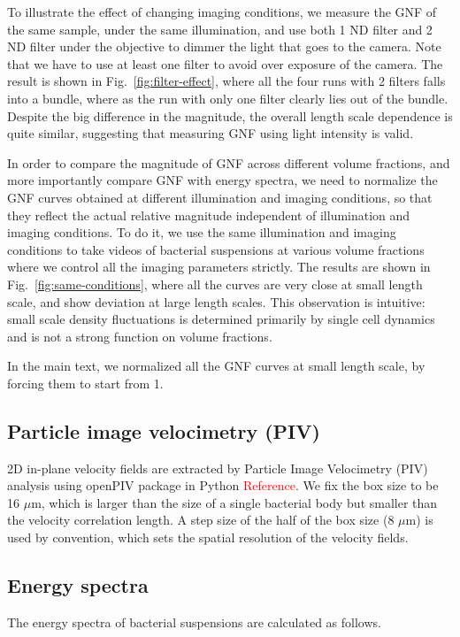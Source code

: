 \documentclass[twocolumn,aps,prx,amsmath,amssymb,longbibliography]{revtex4-2}
\begin{document}
To illustrate the effect of changing imaging conditions, we measure the GNF of the same sample, under the same illumination, and use both 1 ND filter and 2 ND filter under the objective to dimmer the light that goes to the camera. Note that we have to use at least one filter to avoid over exposure of the camera. The result is shown in Fig.~\ref{fig:filter-effect}, where all the four runs with 2 filters falls into a bundle, where as the run with only one filter clearly lies out of the bundle. Despite the big difference in the magnitude, the overall length scale dependence is quite similar, suggesting that measuring GNF using light intensity is valid.

In order to compare the magnitude of GNF across different volume fractions, and more importantly compare GNF with energy spectra, we need to normalize the GNF curves obtained at different illumination and imaging conditions, so that they reflect the actual relative magnitude independent of illumination and imaging conditions. To do it, we use the same illumination and imaging conditions to take videos of bacterial suspensions at various volume fractions where we control all the imaging parameters strictly. The results are shown in Fig.~\ref{fig:same-conditions}, where all the curves are very close at small length scale, and show deviation at large length scales. This observation is intuitive: small scale density fluctuations is determined primarily by single cell dynamics and is not a strong function on volume fractions.

In the main text, we normalized all the GNF curves at small length scale, by forcing them to start from 1.


\subsection{Particle image velocimetry (PIV)}

2D in-plane velocity fields are extracted by Particle Image Velocimetry (PIV) analysis using openPIV package in Python \textcolor{red}{Reference}. %
We fix the box size to be 16 $\mu$m, which is larger than the size of a single bacterial body but smaller than the velocity correlation length. A step size of the half of the box size (8 $\mu$m) is used by convention, which sets the spatial resolution of the velocity fields.

\subsection{Energy spectra}
The energy spectra of bacterial suspensions are calculated as follows.
\end{document}
